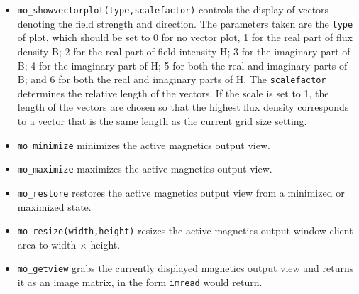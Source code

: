\begin{itemize}
\item{\tt mo\_showvectorplot(type,scalefactor)}
controls the display of vectors denoting the field strength and
direction. The parameters taken are the \texttt{type} of plot,
which should be set to 0 for no vector plot,  1 for the real part of flux density B;
2 for the real part of field intensity H; 3 for the imaginary part of B;
4 for the imaginary part of H; 5 for both the real and imaginary parts of B;
and 6 for both the real and imaginary parts of H. The \texttt{scalefactor}
determines the relative length of the vectors. If the scale is set
to 1, the length of the vectors are chosen so that the highest flux
density corresponds to a vector that is the same length as the
current grid size setting.

\item{\tt mo\_minimize} minimizes the active magnetics output view.
\item{\tt mo\_maximize} maximizes the active magnetics output view.
\item{\tt mo\_restore} restores the active magnetics output view from a
 minimized or maximized state.
\item{\tt mo\_resize(width,height)} resizes the active magnetics output
 window client area to width $\times$ height.
\item{\tt mo\_getview} grabs the currently displayed magnetics output view and
 returns it as an image matrix, in the form \texttt{imread} would return.
\end{itemize}

